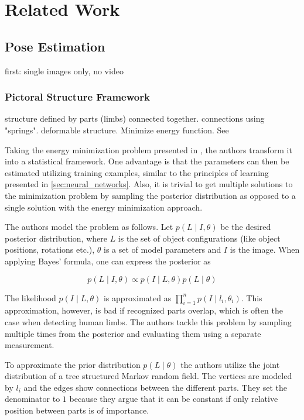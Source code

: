 \chapter{Related Work}

\section{Pose Estimation}
first: single images only, no video
\subsection{Pictoral Structure Framework}
structure defined by parts (limbs) connected together. connections using "springs". deformable structure.
Minimize energy function. See \cite{zhu_articulated_2016}

Taking the energy minimization problem presented in \cite{fischler_representation_1973}, the authors transform it into a statistical framework.
One advantage is that the parameters can then be estimated utilizing training examples, similar to the principles of learning presented in \ref{sec:neural_networks}.
Also, it is trivial to get multiple solutions to the minimization problem by sampling the posterior distribution as opposed to a single solution with the energy minimization approach.

The authors model the problem as follows.
Let $p(L \mid I, \theta)$ be the desired posterior distribution, where $L$ is the set of object configurations (like object positions, rotations etc.), $\theta$ is a set of model parameters and $I$ is the image.
When applying Bayes' formula, one can express the posterior as 

\begin{equation}
    p(L \mid I, \theta) \propto p(I \mid L, \theta) p(L \mid \theta)
\end{equation}

The likelihood $p(I \mid L, \theta)$ is approximated as $\prod_{i=1}^n p(I \mid l_i, \theta_i)$.
This approximation, however, is bad if recognized parts overlap, which is often the case when detecting human limbs.
The authors tackle this problem by sampling multiple times from the posterior and evaluating them using a separate measurement.

To approximate the prior distribution $p(L \mid \theta)$ the authors utilize the joint distribution of a tree structured Markov random field.
The vertices are modeled by $l_i$ and the edges show connections between the different parts. 
They set the denominator to $1$ because they argue that it can be constant if only relative position between parts is of importance.

